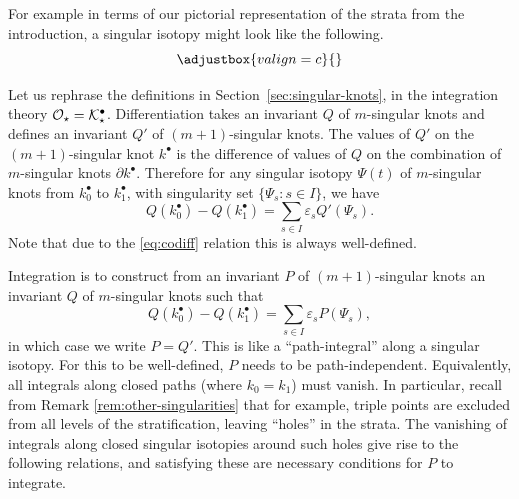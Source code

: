 For example in terms of our pictorial representation of the strata from the introduction, a singular isotopy might look like the following.
\[
	\def\svgscale{0.3}
	\adjustbox{valign=c}{}
\]


Let us rephrase the definitions in Section~\ref{sec:singular-knots}, in the integration theory \(\mathcal{O}_{\star} = \mathcal{K}^{\bullet}_{\star}\). Differentiation takes an invariant \(Q\) of \(m\)-singular knots and defines an invariant \(Q'\) of \((m + 1)\)-singular knots. The values of \(Q'\) on the \((m + 1)\)-singular knot \(k^{\bullet}\) is the difference of values of \(Q\) on the combination of \(m\)-singular knots \(\partial k^{\bullet}\). Therefore for any singular isotopy \(\Psi(t)\) of \(m\)-singular knots from \(k^{\bullet}_{0}\) to \(k^{\bullet}_{1}\), with singularity set \(\{\Psi_{s} : s \in I\}\), we have
\[Q(k^{\bullet}_{0}) - Q(k^{\bullet}_{1}) = \sum_{s \in I}\varepsilon_{s} Q'(\Psi_{s}).\]
Note that due to the \ref{eq:codiff} relation this is always well-defined.

Integration is to construct from an invariant \(P\) of \((m + 1)\)-singular knots an invariant \(Q\) of \(m\)-singular knots such that
\[Q(k^{\bullet}_{0}) - Q(k^{\bullet}_{1}) = \sum_{s \in I}\varepsilon_{s} P(\Psi_{s}),\]
in which case we write \(P = Q'\). This is like a ``path-integral'' along a singular isotopy. For this to be well-defined, \(P\) needs to be path-independent. Equivalently, all integrals along closed paths (where \(k_{0} = k_{1}\)) must vanish. In particular, recall from Remark \ref{rem:other-singularities} that for example, triple points are excluded from all levels of the stratification, leaving ``holes'' in the strata. The vanishing of integrals along closed singular isotopies around such holes give rise to the following relations, and satisfying these are necessary conditions for \(P\) to integrate.

